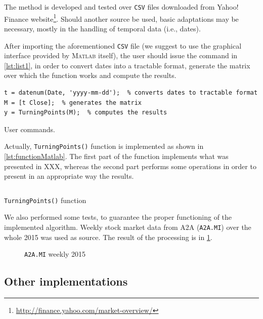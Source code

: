 \documentclass{article}
\newcommand{\matlab}{\textsc{Matlab}\xspace}
\newcommand{\csv}{\texttt{CSV}\xspace}
\begin{document}
The method is developed and tested over \csv files downloaded from Yahoo! Finance website\footnote{\url{http://finance.yahoo.com/market-overview/}}. Should another source be used, basic adaptations may be necessary, mostly in the handling of temporal data (i.e., dates). 

After importing the aforementioned \csv file (we suggest to use the graphical interface provided by \matlab itself), the user should issue the command in \cref{lst:list1}, in order to convert dates into a tractable format, generate the matrix over which the function works and compute the results.

\begin{listing}[H]

\begin{verbatim}
t = datenum(Date, 'yyyy-mm-dd');  % converts dates to tractable format
M = [t Close];  % generates the matrix
y = TurningPoints(M);  % computes the results
\end{verbatim}

\caption{User commands.}\label{lst:list1}

\end{listing}

Actually, \texttt{TurningPoints()} function is implemented as shown in \cref{lst:functionMatlab}. The first part of the function implements what was presented in XXX, whereas the second part performs some operations in order to present in an appropriate way the results.

\begin{listing}[H]

\inputminted{matlab}{../code/TurningPoints.m}

\caption{\texttt{TurningPoints()} function}\label{lst:functionMatlab}

\end{listing}

We also performed some tests, to guarantee the proper functioning of the implemented algorithm. Weekly stock market data from A2A (\texttt{A2A.MI}) over the whole 2015 was used as source. The result of the processing is in \cref{fig:a2a_w_2015}.

\begin{figure}
	
	
	\caption{\texttt{A2A.MI} weekly 2015}
	
	\label{fig:a2a_w_2015}

\end{figure}



\subsection{Other implementations}
\lipsum[4-6]
\end{document}
